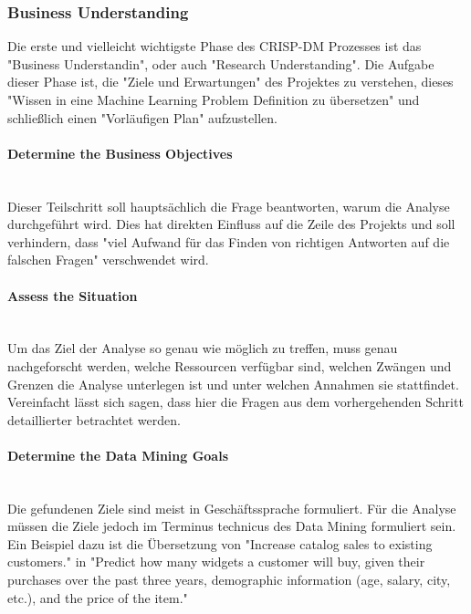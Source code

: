\subsubsection{Business Understanding}
Die erste und vielleicht wichtigste Phase\citep[S.~14]{shearer_crisp-dm_2000} des CRISP-DM Prozesses ist das "Business Understandin", oder auch "Research Understanding"\citep[Punkt 1.4.1.1]{larose_discovering_2014}. Die Aufgabe dieser Phase ist, die "Ziele und Erwartungen"\citep[S.~73]{swamynathan_mastering_2017} des Projektes zu verstehen, dieses "Wissen in eine Machine Learning Problem Definition zu übersetzen" und schließlich einen "Vorläufigen Plan"\citep[S.~14]{shearer_crisp-dm_2000} aufzustellen. 
\paragraph{Determine the Business Objectives}\mbox{} \\
Dieser Teilschritt soll hauptsächlich die Frage beantworten, warum die Analyse durchgeführt wird. Dies hat direkten Einfluss auf die Zeile des Projekts und soll verhindern, dass "viel Aufwand für das Finden von richtigen Antworten auf die falschen Fragen"\citep[S.~14]{chapman_crisp-dm_2000} verschwendet wird.
\paragraph{Assess the Situation}\mbox{} \\
Um das Ziel der Analyse so genau wie möglich zu treffen, muss genau nachgeforscht werden, welche Ressourcen verfügbar sind, welchen Zwängen und Grenzen die Analyse unterlegen ist und unter welchen Annahmen sie stattfindet.\citep[S.~14]{chapman_crisp-dm_2000} Vereinfacht lässt sich sagen, dass hier die Fragen aus dem vorhergehenden Schritt detaillierter betrachtet werden.
\paragraph{Determine the Data Mining Goals}\mbox{} \\
Die gefundenen Ziele sind meist in Geschäftssprache formuliert. Für die Analyse müssen die Ziele jedoch im Terminus technicus des Data Mining formuliert sein. Ein Beispiel dazu ist die Übersetzung von "Increase catalog sales to existing customers." in "Predict how many widgets a customer will buy, given their purchases over the
past three years, demographic information (age, salary, city, etc.), and the price of the item."\citep[S.~16]{chapman_crisp-dm_2000}

